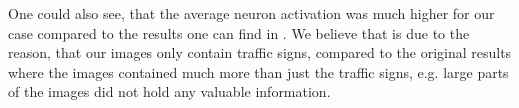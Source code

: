 \documentclass[a4paper,12pt]{report}
\begin{document}
One could also see, that the average neuron activation was much higher for our case compared to the results one can find in \citep{paper}. We believe that is due to the reason, that our images only contain traffic signs, compared to the original results where the images contained much more than just the traffic signs, e.g. large parts of the images did not hold any valuable information.



\listoffigures

	
	
	
	
	
	
	
	
	
	
	
	
	
	
	
	
	
	
	
	
\end{document}
